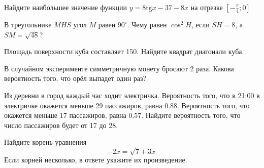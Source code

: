 \begin{taskBN}{11}
Найдите наибольшее значение функции $y = 8\mathrm{tg} x-37-8x$ на отрезке $\left[-\frac{\pi}{4};0 \right]$
\end{taskBN}



\cleardoublepage

\def\examvart{Вариант 13.3}

\normalsize



\large

\begin{taskBN}{1}
В треугольнике $MHS$ угол $M$ равен $90^\circ$. Чему равен  $\cos^2{H}$, если $SH=8$, а  $SM=\sqrt{48}$? 
\end{taskBN}

\begin{taskBN}{2}
Площадь поверхности куба составляет 150. Найдите квадрат диагонали куба.
\end{taskBN}

\begin{taskBN}{3}
В случайном эксперименте симметричную монету бросают 2 раза. Какова вероятность того, что орёл выпадет один раз?
\end{taskBN}

\begin{taskBN}{4}
Из деревни в город каждый час ходит электричка. Вероятность того, что в 21:00 в электричке окажется меньше 29 пассажиров, равна 0.88. Вероятность того, что окажется меньше 17 пассажиров, равна 0.57. Найдите вероятность того, что число пассажиров будет от 17 до 28.
\end{taskBN}

\begin{taskBN}{5}
Найдите корень уравнения $$-2x=\sqrt{7+3x}$$ Если корней несколько, в ответе укажите их произведение.
\end{taskBN}

